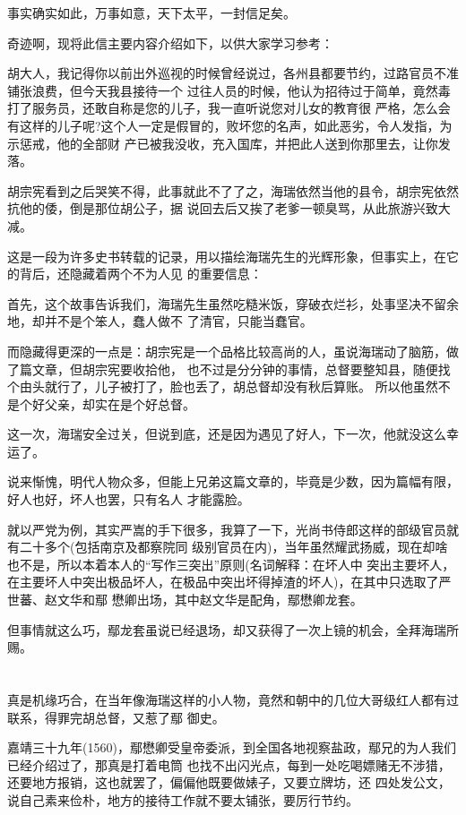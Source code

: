 \documentclass[11pt,a4paper,onecolumn]{article}
\begin{document}
事实确实如此，万事如意，天下太平，一封信足矣。

奇迹啊，现将此信主要内容介绍如下，以供大家学习参考：

胡大人，我记得你以前出外巡视的时候曾经说过，各州县都要节约，过路官员不准铺张浪费，但今天我县接待一个
过往人员的时候，他认为招待过于简单，竟然毒打了服务员，还敢自称是您的儿子，我一直听说您对儿女的教育很
严格，怎么会有这样的儿子呢?这个人一定是假冒的，败坏您的名声，如此恶劣，令人发指，为示惩戒，他的全部财
产已被我没收，充入国库，并把此人送到你那里去，让你发落。

胡宗宪看到之后哭笑不得，此事就此不了了之，海瑞依然当他的县令，胡宗宪依然抗他的倭，倒是那位胡公子，据
说回去后又挨了老爹一顿臭骂，从此旅游兴致大减。

这是一段为许多史书转载的记录，用以描绘海瑞先生的光辉形象，但事实上，在它的背后，还隐藏着两个不为人见
的重要信息：

首先，这个故事告诉我们，海瑞先生虽然吃糙米饭，穿破衣烂衫，处事坚决不留余地，却并不是个笨人，蠢人做不
了清官，只能当蠢官。

而隐藏得更深的一点是：胡宗宪是一个品格比较高尚的人，虽说海瑞动了脑筋，做了篇文章，但胡宗宪要收拾他，
也不过是分分钟的事情，总督要整知县，随便找个由头就行了，儿子被打了，脸也丢了，胡总督却没有秋后算账。
所以他虽然不是个好父亲，却实在是个好总督。

这一次，海瑞安全过关，但说到底，还是因为遇见了好人，下一次，他就没这么幸运了。

说来惭愧，明代人物众多，但能上兄弟这篇文章的，毕竟是少数，因为篇幅有限，好人也好，坏人也罢，只有名人
才能露脸。

就以严党为例，其实严嵩的手下很多，我算了一下，光尚书侍郎这样的部级官员就有二十多个(包括南京及都察院同
级别官员在内)，当年虽然耀武扬威，现在却啥也不是，所以本着本人的``写作三突出''原则(名词解释：在坏人中
突出主要坏人，在主要坏人中突出极品坏人，在极品中突出坏得掉渣的坏人)，在其中只选取了严世蕃、赵文华和鄢
懋卿出场，其中赵文华是配角，鄢懋卿龙套。

但事情就这么巧，鄢龙套虽说已经退场，却又获得了一次上镜的机会，全拜海瑞所赐。

\section[\thesection]{}

真是机缘巧合，在当年像海瑞这样的小人物，竟然和朝中的几位大哥级红人都有过联系，得罪完胡总督，又惹了鄢
御史。

嘉靖三十九年(1560)，鄢懋卿受皇帝委派，到全国各地视察盐政，鄢兄的为人我们已经介绍过了，那真是打着电筒
也找不出闪光点，每到一处吃喝嫖赌无不涉猎，还要地方报销，这也就罢了，偏偏他既要做婊子，又要立牌坊，还
四处发公文，说自己素来俭朴，地方的接待工作就不要太铺张，要厉行节约。
\end{document}
